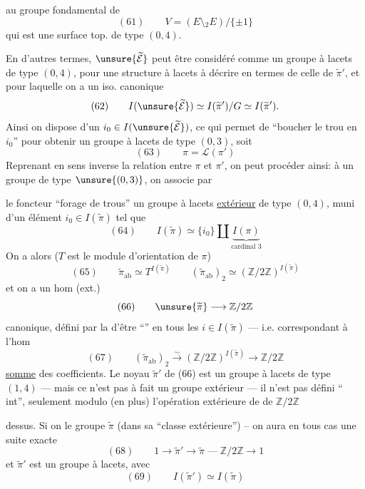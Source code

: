 
au groupe fondamental de
\[
(61)\qquad V=(E\setminus {}_2E)/\{\pm1\}
\]
qui est une surface top. de type $(0,4)$.

En d'autres termes, $\unsure{\widetilde{\mathcal E}}$ peut être considéré comme un groupe à lacets de type $(0,4)$, pour une structure à lacets  à décrire en termes de celle de $\widetilde{\pi}'$, et pour laquelle on a un iso. canonique
\[
(62)\qquad I(\unsure{\widetilde{\mathcal E}})\simeq I(\widetilde{\pi}')/G\simeq I(\widetilde{\pi}').
\]
Ainsi on dispose d'un $i_0\in I(\unsure{\widetilde{\mathcal E}})$, ce qui permet de ``boucher le trou en $i_0$'' pour obtenir un groupe  à lacets de type $(0,3)$, soit \deleted{$\unsure{\pi=}$}
\[
(63)\qquad \pi=\mathcal L(\pi')
\]
Reprenant en sens inverse la relation entre $\pi$ et $\pi'$, on peut procéder ainsi: à un groupe   de type $\unsure{(0,3)}$, on associe par


le foncteur ``forage de trous'' un groupe à lacets \uline{extérieur}  de type $(0,4)$, muni d'un élément $i_0\in I(\widetilde{\pi})$ tel que 
\[
(64)\qquad I(\widetilde{\pi})\simeq\{i_0\}\amalg\underbrace{I(\pi)}_{\text{cardinal }3}
\]
On a alors ($T$ est le module d'orientation de $\pi$)
\[
(65)\qquad \widetilde{\pi}_{\mathrm{ab}}\simeq T^{I(\widetilde{\pi})}\qquad (\widetilde{\pi}_{\mathrm{ab}})_2\simeq(\mathbb Z/2\mathbb Z)^{I(\widetilde{\pi})}
\]
et on a un hom (ext.)
\[
(66)\qquad \unsure{\widetilde{\pi}}\longrightarrow\mathbb Z/2\mathbb Z
\]
canonique, défini par la  d'être ``'' en tous les $i\in I(\widetilde{\pi})$ --- i.e. correspondant à l'hom
\[
(67)\qquad (\widetilde{\pi}_{\mathrm{ab}})_2\xrightarrow{\sim}(\mathbb Z/2\mathbb Z)^{I(\widetilde{\pi})}\longrightarrow\mathbb Z/2\mathbb Z
\]
\uline{somme} des coefficients. Le noyau $\widetilde{\pi}'$ de (66) est un groupe à lacets de type $(1,4)$ --- mais ce n'est pas  à fait un groupe extérieur --- il n'est pas défini ``  int'',  seulement modulo (en plus) l'opération extérieure de  de $\mathbb Z/2\mathbb Z$



dessus. Si on  le groupe $\widetilde{\pi}$ (dans sa ``classe extérieure'') -- on aura en tous cas une suite exacte
\[
(68)\qquad 1\longrightarrow\widetilde{\pi}'\longrightarrow\widetilde{\pi}\mathrel{\text{---}}\mathbb Z/2\mathbb Z\longrightarrow 1
\]
et $\widetilde{\pi}'$ est un groupe à lacets, avec
\[
(69)\qquad I(\widetilde{\pi}')\simeq I(\widetilde{\pi})
\]

